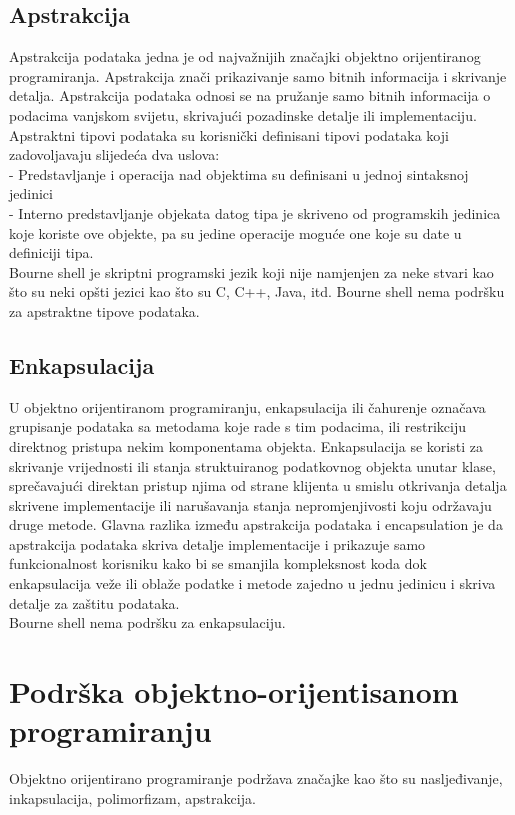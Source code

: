 \documentclass[11pt]{book}
\begin{document}
\subsection{Apstrakcija}
Apstrakcija podataka jedna je od najvažnijih značajki objektno orijentiranog programiranja. Apstrakcija znači prikazivanje samo bitnih informacija i skrivanje detalja. Apstrakcija podataka odnosi se na pružanje samo bitnih informacija o podacima vanjskom svijetu, skrivajući pozadinske detalje ili implementaciju.\\
Apstraktni tipovi podataka su korisnički definisani tipovi podataka koji zadovoljavaju slijedeća dva uslova:\\
- Predstavljanje i operacija nad objektima su definisani u jednoj sintaksnoj
jedinici\\
- Interno predstavljanje objekata datog tipa je skriveno od programskih jedinica
koje koriste ove objekte, pa su jedine operacije moguće one koje su date u
definiciji tipa.\\

Bourne shell je skriptni programski jezik koji nije namjenjen za neke stvari kao što su neki opšti jezici kao što su C, C++, Java, itd. Bourne shell nema podršku za apstraktne tipove podataka.

\subsection{Enkapsulacija}
U objektno orijentiranom programiranju, enkapsulacija ili čahurenje označava grupisanje podataka sa metodama koje rade s tim podacima, ili restrikciju direktnog pristupa nekim komponentama objekta. Enkapsulacija se koristi za skrivanje vrijednosti ili stanja struktuiranog podatkovnog objekta unutar klase, sprečavajući direktan pristup njima od strane klijenta u smislu otkrivanja detalja skrivene implementacije ili narušavanja stanja nepromjenjivosti koju održavaju druge metode.
Glavna razlika između apstrakcija podataka i encapsulation je da apstrakcija podataka skriva detalje implementacije i prikazuje samo funkcionalnost korisniku kako bi se smanjila kompleksnost koda dok enkapsulacija veže ili oblaže podatke i metode zajedno u jednu jedinicu i skriva detalje za zaštitu podataka.\\
Bourne shell nema podršku za enkapsulaciju.

\section{Podrška objektno-orijentisanom programiranju}
Objektno orijentirano programiranje podržava značajke kao što su nasljeđivanje, inkapsulacija, polimorfizam, apstrakcija.\\
\end{document}

